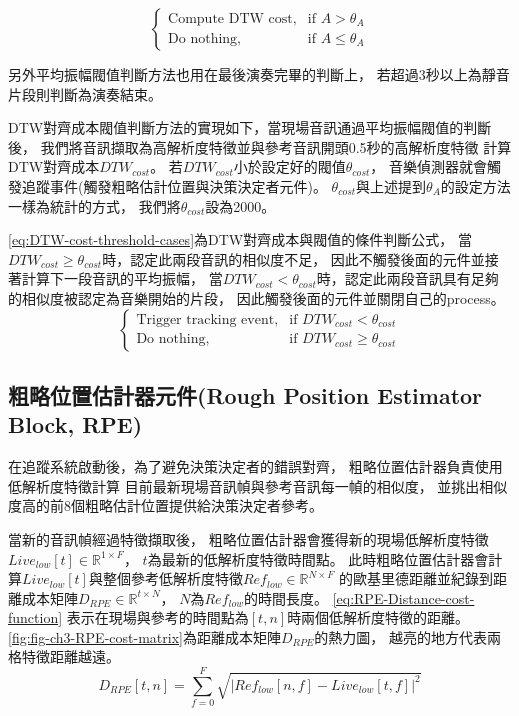 \documentclass[class=NCU_thesis, crop=false]{standalone}
\begin{document}
\begin{equation} 
    \label{eq:amplitude-threshold-cases}
    \begin{cases}
        \text{Compute DTW cost}, & \text{if $A > \theta _{A}$} \\
        \text{Do nothing},  & \text{if $A \leq \theta _{A}$}
    \end{cases}
\end{equation}

另外平均振幅閥值判斷方法也用在最後演奏完畢的判斷上，
若超過3秒以上為靜音片段則判斷為演奏結束。

DTW對齊成本閥值判斷方法的實現如下，當現場音訊通過平均振幅閥值的判斷後，
我們將音訊擷取為高解析度特徵並與參考音訊開頭0.5秒的高解析度特徵
計算DTW對齊成本${DTW_{cost}}$。
若${DTW_{cost}}$小於設定好的閥值$\theta _{cost}$，
音樂偵測器就會觸發追蹤事件(觸發粗略估計位置與決策決定者元件)。
$\theta _{cost}$與上述提到$\theta _{A}$的設定方法一樣為統計的方式，
我們將$\theta _{cost}$設為2000。

\cref{eq:DTW-cost-threshold-cases}為DTW對齊成本與閥值的條件判斷公式，
當$DTW_{cost} \geq \theta _{cost}$時，認定此兩段音訊的相似度不足，
因此不觸發後面的元件並接著計算下一段音訊的平均振幅，
當$DTW_{cost}  < \theta _{cost}$時，認定此兩段音訊具有足夠的相似度被認定為音樂開始的片段，
因此觸發後面的元件並關閉自己的process。
\begin{equation}
    \label{eq:DTW-cost-threshold-cases}
    \begin{cases}
        \text{Trigger tracking event}, & \text{if $DTW_{cost} < \theta _{cost}$} \\
        \text{Do nothing}, & \text{if $DTW_{cost} \geq \theta _{cost}$}
    \end{cases}
\end{equation}

\subsection{粗略位置估計器元件(Rough Position Estimator Block, RPE)} \label{ch3-subst-RPE}
在追蹤系統啟動後，為了避免決策決定者的錯誤對齊，
粗略位置估計器負責使用低解析度特徵計算
目前最新現場音訊幀與參考音訊每一幀的相似度，
並挑出相似度高的前8個粗略估計位置提供給決策決定者參考。

當新的音訊幀經過特徵擷取後，
粗略位置估計器會獲得新的現場低解析度特徵$Live_{low}[t] \in \mathbb{R}^{1 \times F}$，
$t$為最新的低解析度特徵時間點。
此時粗略位置估計器會計算$Live_{low}[t]$與整個參考低解析度特徵$Ref_{low} \in \mathbb{R}^{N \times F}$
的歐基里德距離並紀錄到距離成本矩陣$D_{RPE} \in \mathbb{R}^{t \times N}$，
$N$為$Ref_{low}$的時間長度。
\cref{eq:RPE-Distance-cost-function}
表示在現場與參考的時間點為$[t, n]$時兩個低解析度特徵的距離。
\cref{fig:fig-ch3-RPE-cost-matrix}為距離成本矩陣$D_{RPE}$的熱力圖，
越亮的地方代表兩格特徵距離越遠。
\begin{equation}
    \label{eq:RPE-Distance-cost-function}
    D_{RPE}[t, n] = \sum_{f = 0}^{F}\sqrt{
    \left\lvert Ref_{low}[n, f]-Live_{low}[t, f]\right\rvert^{2}} 
\end{equation}
\end{document}
